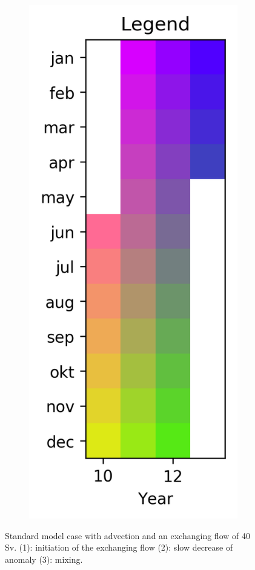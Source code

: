 \documentclass[twocolumn]{article}
\begin{document}
\begin{figure}
\begin{subfigure}[h]{0.20\textwidth}
\includegraphics[width=1.0\textwidth,keepaspectratio]{with_adv_large_effect_40SV_Legend.png}
\end{subfigure}\hfill
\caption{Standard model case with advection and an exchanging flow of 40 Sv. (1): initiation of the exchanging flow (2): slow decrease of anomaly (3): mixing. }
\label{fig:with_adv_large_effect}
\end{figure}
\end{document}
